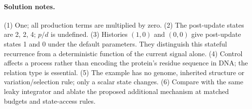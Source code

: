 \paragraph{Solution notes.}
(1) One; all production terms are multiplied by zero. (2) The post-update
states are 2, 2, 4; $p/d$ is undefined. (3) Histories $(1,0)$ and $(0,0)$ give
post-update states 1 and 0 under the default parameters. They distinguish this
stateful recurrence from a deterministic function of the current signal alone.
(4) Control affects a process rather than encoding the protein's residue
sequence in DNA; the relation type is essential. (5) The example has no genome,
inherited structure or variation/selection rule; only a scalar state changes.
(6) Compare with the same leaky integrator and ablate the proposed additional
mechanism at matched budgets and state-access rules.
